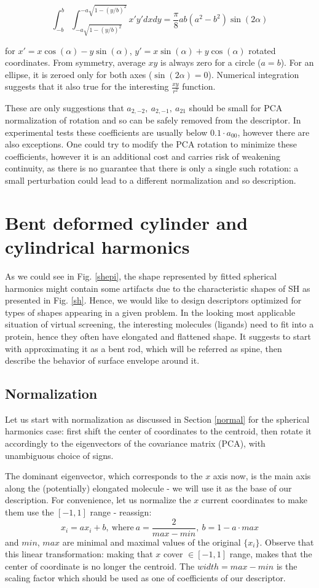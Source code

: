 \documentclass[10pt,journal]{IEEEtranTCOM}
\theoremstyle{plain}
\begin{document}
$$\int_{-b}^b\int_{-a\sqrt{1-(y/b)^2}}^{-a\sqrt{1-(y/b)^2}} x'y' dx dy=\frac{\pi}{8}ab(a^2-b^2)\sin(2\alpha)$$

for $x'=x \cos(\alpha)-y \sin(\alpha)$, $y'=x\sin(\alpha)+y\cos(\alpha)$ rotated coordinates. From symmetry, average $xy$ is always zero for a circle ($a=b$). For an ellipse, it is zeroed only for both axes ($\sin(2\alpha)=0$). Numerical integration suggests that it also true for the interesting $\frac{xy}{r^2}$ function.

These are only suggestions that $a_{2,-2},\ a_{2,-1},\ a_{21}$ should be small for PCA normalization of rotation and so can be safely removed from the descriptor. In experimental tests these coefficients are usually below $0.1\cdot a_{00}$, however there are also exceptions. One could try to modify the PCA rotation to minimize these coefficients, however it is an additional cost and carries risk of weakening continuity, as there is no guarantee that there is only a single such rotation: a small perturbation could lead to a different normalization and so description.

\section{Bent deformed cylinder and cylindrical harmonics}
As we could see in Fig. \ref{shepi}, the shape represented by fitted spherical harmonics might contain some artifacts due to the characteristic shapes of SH as presented in Fig. \ref{sh}. Hence, we would like to design descriptors optimized for types of shapes appearing in a given problem. In the looking most applicable situation of virtual screening, the interesting molecules (ligands) need to fit into a protein, hence they often have elongated and flattened shape. It suggests to start with approximating it as a bent rod, which will be referred as spine, then describe the behavior of surface envelope around it.
\subsection{Normalization}
Let us start with normalization as discussed in Section \ref{normal} for the spherical harmonics case: first shift the center of coordinates to the centroid, then rotate it accordingly to the eigenvectors of the covariance matrix (PCA), with unambiguous choice of signs.

The dominant eigenvector, which corresponds to the $x$ axis now, is the main axis along the (potentially) elongated molecule - we will use it as the base of our description. For convenience, let us normalize the $x$ current coordinates to make them use the $[-1,1]$ range - reassign:
$$x_i = a x_i + b,\ \textrm{where}\ a=\frac{2}{max-min},\ b=1-a\cdot max$$
and $min$, $max$ are minimal and maximal values of the original $\{x_i\}$. Observe that this linear transformation: making that $x$ cover $\in[-1,1]$ range, makes that the center of coordinate is no longer the centroid. The $width=max-min$ is the scaling factor which should be used as one of coefficients of our descriptor.
\end{document}
